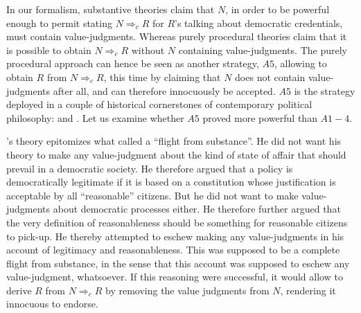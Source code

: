 \documentclass[preprint, french, english, 11pt, authoryear]{elsarticle}%
\begin{document}
In our formalism, substantive theories claim that $N$, in order to be powerful enough to permit stating $N ⇒_c R$ for $R$’s talking about democratic credentials, must contain value-judgments. Whereas purely procedural theories claim that it is possible to obtain $N ⇒_c R$ without $N$ containing value-judgments. The purely procedural approach can hence be seen as another strategy, $A5$, allowing to obtain $R$ from $N ⇒_c R$, this time by claiming that $N$ does not contain value-judgments after all, and can therefore innocuously be accepted. $A5$ is the strategy deployed in a couple of historical cornerstones of contemporary political philosophy: \cite{rawls_political_2005} and \cite{habermas_moralbewustsein_1983}. Let us examine whether $A5$ proved more powerful than $A1-4$.

\cite{rawls_political_2005}'s theory epitomizes what \cite{estlund_democratic_2009} called a “flight from substance”. He did not want his theory to make any value-judgment about the kind of state of affair that should prevail in a democratic society. He therefore argued that a policy is democratically legitimate if it is based on a constitution whose justification is acceptable by all  “reasonable” citizens. But he did not want to make value-judgments about democratic processes either. He therefore further argued that the very definition of reasonableness should be something for reasonable citizens to pick-up. He thereby attempted to eschew making any value-judgments in his account of legitimacy and reasonableness. This was supposed to be a complete flight from substance, in the sense that this account was supposed to eschew any value-judgment, whatsoever. If this reasoning were successful, it would allow to derive $R$ from $N ⇒_c R$ by removing the value judgments from $N$, rendering it innocuous to endorse.
\end{document}
